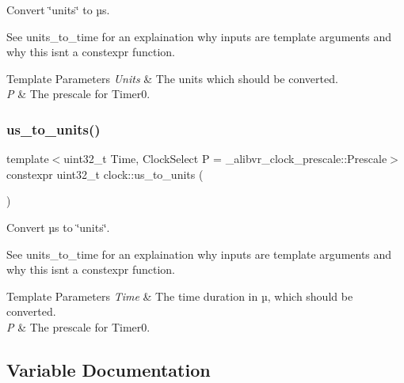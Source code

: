 Convert \char`\"{}units\char`\"{} to µs. 

See units\+\_\+to\+\_\+time for an explaination why inputs are template arguments and why this isn\textquotesingle{}t a constexpr function.


\begin{DoxyTemplParams}{Template Parameters}
{\em Units} & The units which should be converted. \\
\hline
{\em P} & The prescale for {\ttfamily Timer0}. \\
\hline
\end{DoxyTemplParams}
\hypertarget{namespaceclock_a058555acfdfbc406daf1cb9331b0bc6f}{}\label{namespaceclock_a058555acfdfbc406daf1cb9331b0bc6f} 
\subsubsection{\texorpdfstring{us\+\_\+to\+\_\+units()}{us\_to\_units()}}
{\footnotesize\ttfamily template$<$uint32\+\_\+t Time, Clock\+Select P = \+\_\+alibvr\+\_\+clock\+\_\+prescale\+::\+Prescale$>$ \\
constexpr uint32\+\_\+t clock\+::us\+\_\+to\+\_\+units (\begin{DoxyParamCaption}{ }\end{DoxyParamCaption})\hspace{0.3cm}{\ttfamily [inline]}}



Convert µs to \char`\"{}units\char`\"{}. 

See units\+\_\+to\+\_\+time for an explaination why inputs are template arguments and why this isn\textquotesingle{}t a constexpr function.


\begin{DoxyTemplParams}{Template Parameters}
{\em Time} & The time duration in µ, which should be converted. \\
\hline
{\em P} & The prescale for {\ttfamily Timer0}. \\
\hline
\end{DoxyTemplParams}


\subsection{Variable Documentation}
\hypertarget{namespaceclock_a0cfce972d3684eddb3dd61bb0baaf225}{}\label{namespaceclock_a0cfce972d3684eddb3dd61bb0baaf225} 
